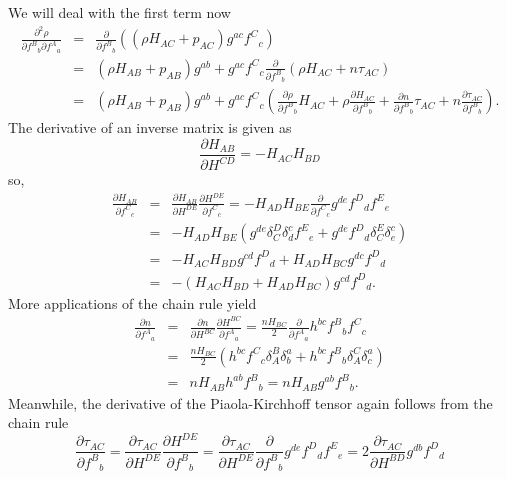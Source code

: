 We will deal with the first term now
\begin{eqnarray}
\frac{\partial^2 \rho}{\partial f^B{}_b \partial f^A{}_a} & = & \frac{\partial}{\partial f^B{}_b}\left( \left( \rho H_{AC} + p_{AC} \right)g^{ac}f^{C}{}_c \right) \\
 & = & \left( \rho H_{AB} + p_{AB} \right)g^{ab} + g^{ac}f^{C}{}_c\frac{\partial}{\partial f^B{}_b}\left( \rho H_{AC} + n\tau_{AC} \right) \\
 & = & \left( \rho H_{AB} + p_{AB} \right)g^{ab} + g^{ac}f^{C}{}_c\left( \frac{\partial \rho}{\partial f^B{}_b} H_{AC} + \rho \frac{\partial H_{AC}}{\partial f^B{}_b} + \frac{\partial n}{\partial f^B{}_b}\tau_{AC} + n\frac{\partial \tau_{AC}}{\partial f^B{}_b} \right).
\end{eqnarray}
The derivative of an inverse matrix is given as
\begin{equation}
\frac{\partial H_{AB}}{\partial H^{CD}} = -H_{AC}H_{BD}
\end{equation}
so,
\begin{eqnarray}
\frac{\partial H_{AB}}{\partial f^C{}_c} & = & \frac{\partial H_{AB}}{\partial H^{DE}}\frac{\partial H^{DE}}{\partial f^C{}_c} = -H_{AD}H_{BE} \frac{\partial}{\partial f^C{}_c} g^{de}f^D{}_df^E{}_e \\
 & = & -H_{AD}H_{BE} \left( g^{de}\delta^D_C\delta^c_d f^E{}_e + g^{de}f^D{}_d\delta^E_C\delta^c_e\right) \\
 & = & -H_{AC}H_{BD}g^{cd} f^D{}_d + H_{AD}H_{BC}g^{dc}f^D{}_d \\
 & = & -\left(H_{AC}H_{BD} + H_{AD}H_{BC}\right)g^{cd}f^D{}_d.
\end{eqnarray}
More applications of the chain rule yield
\begin{eqnarray}
\frac{\partial n}{\partial f^A{}_a} & = & \frac{\partial n}{\partial H^{BC}}\frac{\partial H^{BC}}{\partial f^A{}_a} = \frac{nH_{BC}}{2}\frac{\partial }{\partial f^A{}_a} h^{bc}f^B{}_b f^C{}_c\\
 & = & \frac{nH_{BC}}{2}\left(h^{bc}f^C{}_c\delta^B_A\delta^a_b + h^{bc}f^B{}_b \delta^C_A\delta^a_c\right) \\
 & = & nH_{AB}h^{ab}f^B{}_b = nH_{AB}g^{ab}f^B{}_b.
\end{eqnarray}
Meanwhile, the derivative of the Piaola-Kirchhoff tensor again follows from the chain rule
\begin{equation}
\frac{\partial \tau_{AC}}{\partial f^B{}_b} = \frac{\partial \tau_{AC}}{\partial H^{DE}}\frac{\partial H^{DE}}{\partial f^B{}_b} = \frac{\partial \tau_{AC}}{\partial H^{DE}}\frac{\partial }{\partial f^B{}_b}g^{de} f^D{}_d f^E{}_e = 2\frac{\partial \tau_{AC}}{\partial H^{BD}} g^{db}f^D{}_d
\end{equation}

